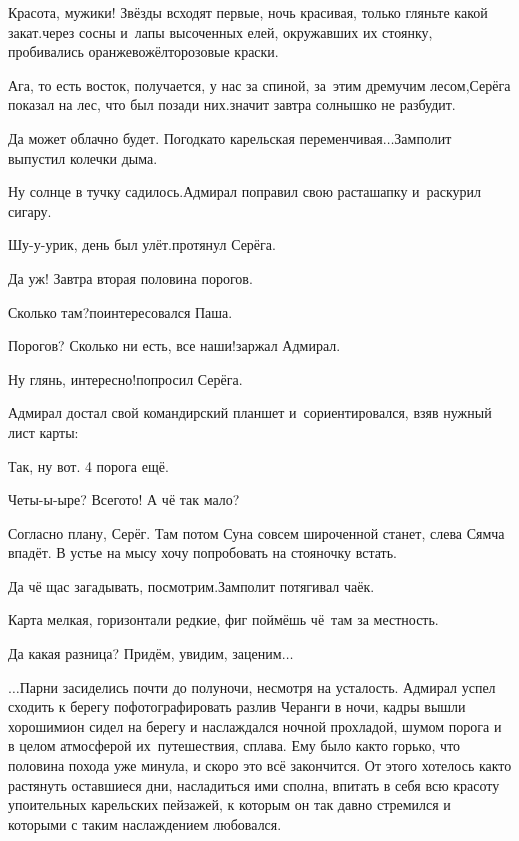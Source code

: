 \diagdash Красота, мужики! Звёзды всходят первые, ночь красивая, только гляньте какой закат.\mdash через сосны и~лапы высоченных елей, окружавших их стоянку, пробивались оранжево\sdash жёлто\sdash розовые краски.

\diagdash Ага, то есть восток, получается, у нас за спиной, за~этим дремучим лесом,\mdash Серёга показал на лес, что был позади них.\mdash значит завтра солнышко не разбудит. 

\diagdash Да может облачно будет. Погодка\sdash то карельская переменчивая$\ldots$\mdash Замполит выпустил колечки дыма.

\diagdash Ну солнце в тучку садилось.\mdash Адмирал поправил свою раста\sdash шапку и~раскурил сигару. 

\diagdash Шу-у-урик, день был улёт.\mdash протянул Серёга.

\diagdash Да уж! Завтра вторая половина порогов.

\diagdash Сколько там?\mdash поинтересовался Паша.

\diagdash Порогов? Сколько ни есть, все наши!\mdash заржал Адмирал.

\diagdash Ну глянь, интересно!\mdash попросил Серёга.

Адмирал достал свой командирский планшет и~сориентировался, взяв нужный лист карты:

\diagdash Так, ну вот. 4 порога ещё.

\diagdash Четы-ы-ыре? Всего\sdash то! А чё так мало?

\diagdash Согласно плану, Серёг. Там потом Суна совсем широченной станет, слева Сямча впадёт. В устье на мысу хочу попробовать на стояночку встать.

\diagdash Да чё щас загадывать, посмотрим.\mdash Замполит потягивал чаёк.

\diagdash Карта мелкая, горизонтали редкие, фиг поймёшь чё~там за местность.

\diagdash Да какая разница? Придём, увидим, заценим$\ldots$

\vspace{0.5cm}
$\ldots$Парни засиделись почти до полуночи, несмотря на усталость. Адмирал успел сходить к берегу пофотографировать разлив Черанги в ночи, кадры вышли хорошими\mdash он сидел на берегу и наслаждался ночной прохладой, шумом порога и в целом атмосферой их~путешествия, сплава. Ему было как\sdash то горько, что половина похода уже минула, и скоро это всё закончится. От этого хотелось как\sdash то растянуть оставшиеся дни, насладиться ими сполна, впитать в себя всю красоту упоительных карельских пейзажей, к которым он так давно стремился и которыми с таким наслаждением любовался.















\begin{center}
\end{center}
